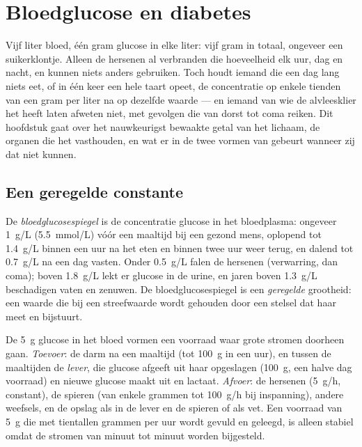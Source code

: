 \chapter{Bloedglucose en diabetes}\label{ch:g12:glucose-and-diabetes}

Vijf liter bloed, één gram glucose in elke liter: vijf gram in totaal,
ongeveer een suikerklontje. Alleen de hersenen al verbranden die
hoeveelheid elk uur, dag en nacht, en kunnen niets anders gebruiken. Toch
houdt iemand die een dag lang niets eet, of in één keer een hele taart
opeet, de concentratie op enkele tienden van een gram per liter na op
dezelfde waarde --- en iemand van wie de alvleesklier het heeft laten
afweten niet, met gevolgen die van dorst tot coma reiken. Dit hoofdstuk
gaat over het nauwkeurigst bewaakte getal van het lichaam, de organen die
het vasthouden, en wat er in de twee vormen van  gebeurt wanneer
zij dat niet kunnen.

\section{Een geregelde constante}

\begin{definition}[Bloedglucosespiegel]\label{def:g12:glucose-and-diabetes:glycaemia}
De \emph{bloedglucosespiegel} is de
concentratie glucose in het bloedplasma: ongeveer \qty{1}{g/L}
(\qty{5.5}{mmol/L}) vóór een maaltijd bij een gezond mens, oplopend tot
\qty{1.4}{g/L} binnen een uur na het eten en binnen twee uur weer terug,
en dalend tot \qty{0.7}{g/L} na een dag vasten. Onder \qty{0.5}{g/L}
falen de hersenen (verwarring, dan coma); boven \qty{1.8}{g/L} lekt er
glucose in de urine, en jaren boven \qty{1.3}{g/L} beschadigen vaten en
zenuwen. De bloedglucosespiegel is een \emph{geregelde} grootheid: een
waarde die bij een streefwaarde wordt gehouden door een stelsel dat haar
meet en bijstuurt.
\end{definition}

\begin{proposition}\label{prop:g12:glucose-and-diabetes:pool}
De \qty{5}{g} glucose in het bloed vormen een voorraad waar grote stromen
doorheen gaan. \emph{Toevoer}: de darm na een maaltijd (tot \qty{100}{g}
in een uur), en tussen de maaltijden de \emph{lever}, die glucose afgeeft
uit haar opgeslagen \emph{} (\qty{100}{g}, een halve dag
voorraad) en nieuwe glucose maakt uit  en lactaat.
\emph{Afvoer}: de hersenen (\qty{5}{g/h}, constant), de spieren (van
enkele grammen tot \qty{100}{g/h} bij inspanning), andere weefsels, en de
opslag als  in de lever en de spieren of als vet. Een voorraad
van \qty{5}{g} die met tientallen grammen per uur wordt gevuld en
geleegd, is alleen stabiel omdat de stromen van minuut tot minuut worden
bijgesteld.
\end{proposition}
\admitted


